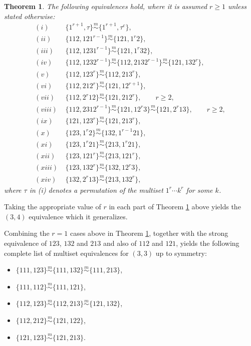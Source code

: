 \documentclass[11pt]{amsart}
\theoremstyle{plain}
\newtheorem{theorem}{Theorem}[section]
\theoremstyle{definition}
\newcommand{\csim}{\stackrel{m}{\sim}}
\begin{document}
\begin{theorem}\label{general}
 The following equivalences hold, where it is assumed $r \geq 1$ unless stated otherwise:
\begin{align*}
(i)&~\{1^{r+1},\tau\}\csim\{1^{r+1},\tau^c\},\\
(ii)&~\{112,121^{r-1}\}\csim\{121,1^r2\},\\
(iii)&~\{112,1231^{r-1}\}\csim\{121,1^r32\},\\
(iv)&~\{112,1232^{r-1}\}\csim\{112,2132^{r-1}\}\csim\{121,132^r\},\\
(v)&~\{112,123^r\}\csim\{112,213^r\},\\
(vi)&~\{112,212^r\}\csim\{121,12^{r+1}\},\\
(vii)&~\{112,2^r12\}\csim\{121,212^r\}, \qquad r \geq 2,\\
(viii)&~\{112,2312^{r-1}\}\csim\{121,12^r3\}\csim\{121,2^r13\}, \qquad r \geq 2,\\
(ix)&~\{121,123^r\}\csim\{121,213^r\},\\
(x)&~\{123,1^r2\}\csim\{132,1^{r-1}21\},\\
(xi)&~\{123,1^r21\}\csim\{213,1^r21\},\\
(xii)&~\{123,121^r\}\csim\{213,121^r\},\\
(xiii)&~\{123,132^r\}\csim\{132,12^r3\},\\
(xiv)&~\{132,2^r13\}\csim\{213,132^r\},
\end{align*}
where $\tau$ in (i) denotes a permutation of the multiset $1^r\cdots k^r$ for some $k$.
\end{theorem}

Taking the appropriate value of $r$ in each part of Theorem \ref{general} above yields the $(3,4)$ equivalence which it generalizes.

Combining the $r=1$ cases above in Theorem \ref{general}, together with the strong equivalence of $123$, $132$ and $213$ and also of $112$ and $121$,
yields the following complete list of multiset equivalences for $(3,3)$ up to symmetry:
\begin{itemize}
\item $\{111,123\}\csim\{111,132\}\csim\{111,213\}$,
\item $\{111,112\}\csim\{111,121\}$,
\item $\{112,123\}\csim\{112,213\}\csim\{121,132\}$,
\item $\{112,212\}\csim\{121,122\}$,
\item $\{121,123\}\csim\{121,213\}$. \medskip
\end{itemize}
\end{document}
